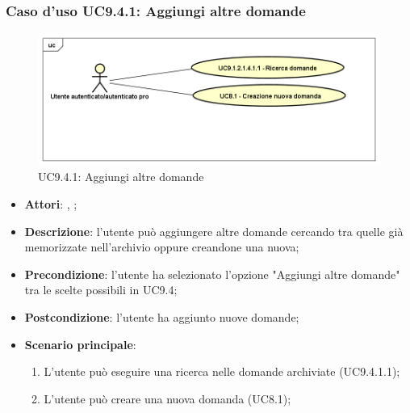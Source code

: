 		 \subsubsection{Caso d'uso UC9.4.1: Aggiungi altre domande}
		 \label{UC9.4.1}
		 \begin{figure}[h]
		 	\centering
		 	\includegraphics[scale=0.5,keepaspectratio]{UML/UC9_1_2_1_4_1.png}
		 	\caption{UC9.4.1: Aggiungi altre domande}
		 \end{figure}
		 \FloatBarrier
		 \begin{itemize}
		 	\item \textbf{Attori}: \uau, \uaupro;
		 	\item \textbf{Descrizione}: l'utente può aggiungere altre domande cercando tra quelle già memorizzate nell'archivio oppure creandone una nuova; 
		 	\item \textbf{Precondizione}: l'utente ha selezionato l'opzione "Aggiungi altre domande" tra le scelte possibili in UC9.4;
		 	\item \textbf{Postcondizione}: l'utente ha aggiunto nuove domande;
		 	\item \textbf{Scenario principale}:
		 	\begin{enumerate}
		 		\item L'utente può eseguire una ricerca nelle domande archiviate (UC9.4.1.1);
		 		\item L'utente può creare una nuova domanda (UC8.1);
		 	\end{enumerate}
		 \end{itemize}
		 
